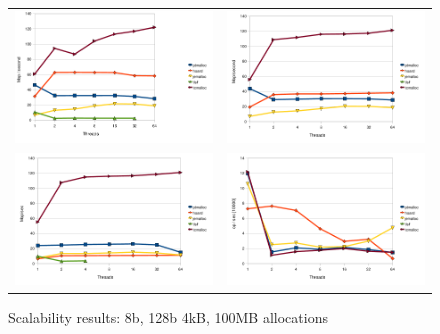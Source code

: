 \begin{figure}
\begin{center}
\begin{tabular}{cc}
\includegraphics[width=0.5\linewidth,keepaspectratio]{fig/scalability_chart1} &
\includegraphics[width=0.5\linewidth,keepaspectratio]{fig/scalability_chart4} \\
\includegraphics[width=0.5\linewidth,keepaspectratio]{fig/scalability_chart3} &
\includegraphics[width=0.5\linewidth,keepaspectratio]{fig/scalability_chart2}
\end{tabular}
\caption{Scalability results: 8b, 128b 4kB, 100MB allocations}
\label{scalability}
\end{center}
\end{figure}

